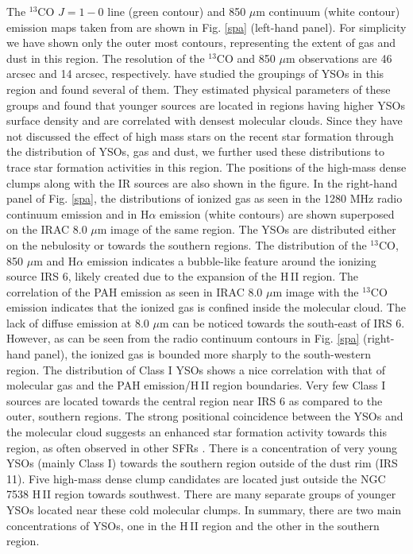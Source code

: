 \documentclass[a4paper,fleqn,usenatbib,useAMS]{mnras}
\begin{document}
The  $^{13}$CO $J = 1-0$ line (green contour) and 850 $\mu$m continuum (white contour) emission 
maps taken from \citet{2014MNRAS.439.3719C} are shown in Fig. \ref{spa} (left-hand panel). 
For simplicity we have shown only the outer most contours, representing the extent of gas and dust 
in this region.
The resolution of the $^{13}$CO and 850 $\mu$m observations are 46 arcsec and 14 arcsec, respectively.
\citet{2014MNRAS.439.3719C} have studied the groupings of YSOs in this region and found several of them. 
They  estimated physical parameters of these groups and found that younger sources  are located in  
regions having higher YSOs surface density and are correlated with densest molecular clouds. 
Since they have not discussed the effect of high mass stars on the recent star formation through the distribution of YSOs, gas and dust,
we further used these distributions to trace star formation activities in this region.
The positions of the high-mass dense clumps \citep{2013ApJ...773..102F}  along with the IR sources are also shown in the figure.
In the right-hand panel of Fig. \ref{spa}, the distributions of ionized gas as seen in the 
1280 MHz radio continuum emission \citep[green contours,][]{2004ApJ...616.1042O} and in H$\alpha$ emission (white contours) are 
shown superposed on the IRAC  8.0 $\mu$m image of the same region.
The YSOs are distributed either on the nebulosity or towards the southern regions.
The distribution of the $^{13}$CO, 850 $\mu$m and H$\alpha$ emission indicates a bubble-like feature around the ionizing
source IRS 6, likely created due to the expansion of the H\,{\sevensize II}  region. 
The correlation of the PAH emission  
as seen in IRAC 8.0 $\mu$m image \citep{2009A&A...494..987P} with the $^{13}$CO emission indicates that the ionized gas
is confined inside the molecular cloud. 
The lack of  diffuse emission at 8.0 $\mu$m can be noticed towards the south-east of IRS 6. However, as can be seen 
from the radio continuum contours  in Fig. \ref{spa} (right-hand panel), 
the ionized gas is bounded more sharply to the south-western region.
The distribution of  Class I YSOs shows a nice correlation with that
of molecular gas and the PAH emission/H\,{\sevensize II}  region boundaries. 
Very few Class I sources are located towards the central region near IRS 6 as compared to the outer, southern regions.
The strong positional coincidence between the YSOs and the molecular cloud
suggests an enhanced star formation activity towards this region, as
often observed in other SFRs \citep[e.g.][]{2009ApJS..181..321E,2009A&A...504..461F}.
There is a concentration of very young YSOs (mainly Class I) towards the southern region outside of the dust rim (IRS 11).
Five high-mass dense clump candidates \citep{2013ApJ...773..102F} are located just outside the NGC 7538 H\,{\sevensize II}  region towards southwest.
There are many separate groups of younger YSOs located near these cold molecular clumps.
In summary, there are two main concentrations of YSOs, one  
in the  H\,{\sevensize II}  region and the other in the southern region. 
\end{document}
